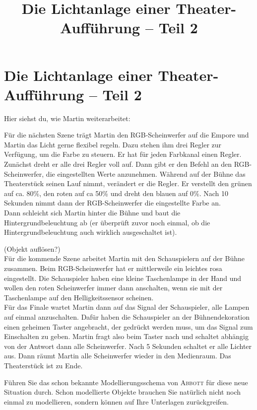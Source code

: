 \documentclass[11pt, a4paper]{scrartcl}
\title{Die Lichtanlage einer Theater-Aufführung -- Teil 2}
\begin{document}
\section*{Die Lichtanlage einer Theater-Aufführung -- Teil 2}

Hier siehst du, wie Martin weiterarbeitet:

\begin{mdframed}
Für die nächsten Szene trägt Martin den RGB-Scheinwerfer auf die Empore und Martin das Licht gerne flexibel regeln. Dazu stehen ihm drei Regler zur Verfügung, um die Farbe zu steuern. Er hat für jeden Farbkanal einen Regler.\\

Zunächst dreht er alle drei Regler voll auf. Dann gibt er den Befehl an den RGB-Scheinwerfer, die eingestellten Werte anzunehmen. Während auf der Bühne das Theaterstück seinen Lauf nimmt, verändert er die Regler. Er verstellt den grünen auf ca. 80\%, den roten auf ca 50\% und dreht den blauen auf 0\%. Nach 10 Sekunden nimmt dann der RGB-Scheinwerfer die eingestellte Farbe an.\\

Dann schleicht sich Martin hinter die Bühne und baut die Hintergrundbeleuchtung ab (er überprüft zuvor noch einmal, ob die Hintergrundbeleuchtung auch wirklich ausgeschaltet ist).

(Objekt auflösen?)\\

Für die kommende Szene arbeitet Martin mit den Schauspielern auf der Bühne zusammen. Beim RGB-Scheinwerfer hat er mittlerweile ein leichtes rosa eingestellt. Die Schauspieler haben eine kleine Taschenlampe in der Hand und wollen den roten Scheinwerfer immer dann anschalten, wenn sie mit der Taschenlampe auf den Helligkeitssensor scheinen.\\

Für das Finale wartet Martin dann auf das Signal der Schauspieler, alle Lampen auf einmal anzuschalten. Dafür haben die Schauspieler an der Bühnendekoration einen geheimen Taster angebracht, der gedrückt werden muss, um das Signal zum Einschalten zu geben. Martin fragt also beim Taster nach und schaltet abhängig von der Antwort dann alle Scheinwerfer. Nach 5 Sekunden schaltet er alle Lichter aus. Dann räumt Martin alle Scheinwerfer wieder in den Medienraum. Das Theaterstück ist zu Ende. 
\end{mdframed}

\vfill

\begin{aufgabe}
Führen Sie das schon bekannte Modellierungsschema von \textsc{Abbott} für diese neue Situation durch. Schon modellierte Objekte brauchen Sie natürlich nicht noch einmal zu modellieren, sondern können auf Ihre Unterlagen zurückgreifen.
\end{aufgabe}
\end{document}
